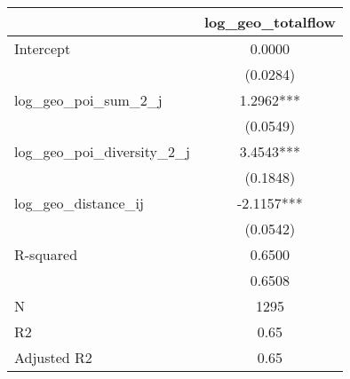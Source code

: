 \begin{table}
\caption{}
\begin{center}
\begin{tabular}{lc}
\hline
                               & log\_geo\_totalflow  \\
\midrule
Intercept                      & 0.0000               \\
                               & (0.0284)             \\
log\_geo\_poi\_sum\_2\_j       & 1.2962***            \\
                               & (0.0549)             \\
log\_geo\_poi\_diversity\_2\_j & 3.4543***            \\
                               & (0.1848)             \\
log\_geo\_distance\_ij         & -2.1157***           \\
                               & (0.0542)             \\
R-squared                      & 0.6500               \\
                               & 0.6508               \\
N                              & 1295                 \\
R2                             & 0.65                 \\
Adjusted R2                    & 0.65                 \\
\hline
\end{tabular}
\end{center}
\end{table}